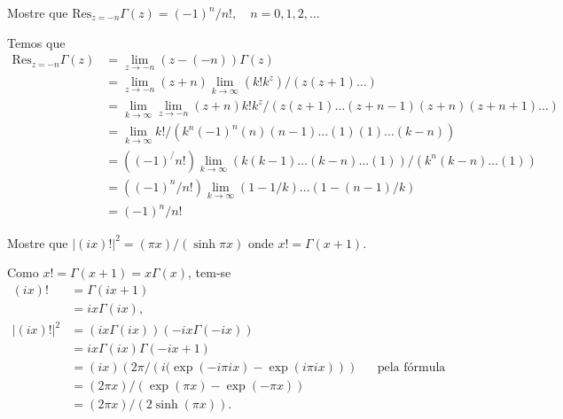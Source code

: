 \documentclass[a4paper,12pt, leqno, answers]{exam}
\begin{document}
\begin{questions}
    \question Mostre que $\mathrm{Res}_{z = -n} \Gamma(z) = \left( -1 \right)^n / n!, \quad n = 0, 1, 2, \ldots$
    \begin{solution}
        Temos que
        \begin{align*}
            \mathrm{Res}_{z = -n} \Gamma(z) &= \lim_{z \to - n} \left( z - (-n) \right) \Gamma(z) \\
            &= \lim_{z \to -n} \left( z + n \right) \lim_{k \to \infty} \left( k! k^z \right) / \left( z (z + 1) \ldots \right) \\
            &= \lim_{k \to \infty} \lim_{z \to -n} (z + n) k! k^z / \left( z (z + 1) \ldots (z + n - 1) (z + n) (z + n + 1) \ldots \right) \\
            &= \lim_{k \to \infty} k! / \left( k^n (-1)^n (n) (n - 1) \ldots (1) (1) \ldots (k - n) \right) \\
            &= \left( (-1)^ / n! \right) \lim_{k \to \infty} \left( k (k - 1) \ldots (k - n) \ldots (1) \right) / \left( k^n (k - n) \ldots (1) \right) \\
            &= \left( (-1)^n / n! \right) \lim_{k \to \infty} \left( 1 - 1 /k \right) \ldots \left( 1 - (n - 1) / k \right) \\
            &= (-1)^n / n!
        \end{align*}
    \end{solution}

    \question Mostre que $| \left( i x \right)! |^2 = \left( \pi x \right) / \left( \sinh \pi x \right)$ onde $x! = \Gamma(x + 1)$.
    \begin{solution}
        Como $x! = \Gamma(x + 1) = x \Gamma(x)$, tem-se
        \begin{align*}
            (i x)! &= \Gamma(ix + 1) \\
            &= ix \Gamma(i x), \\
            | (i x)! |^2 &= \left( i x \Gamma(i x) \right) \left( -i x \Gamma(-i x) \right) \\
            &= i x \Gamma(i x) \Gamma(-i x + 1) \\
            &= (i x) \left( 2 \pi / \left( i ( \exp(-i \pi i x) - \exp(i \pi i x) \right) \right) && \text{pela f\'{o}rmula de reflex\~{a}o} \\
            &=\left( 2 \pi x \right) / \left( \exp(\pi x) - \exp(-\pi x) \right) \\
            &= \left( 2 \pi x \right) / \left( 2 \sinh(\pi x) \right).
        \end{align*}


\end{solution}
\end{questions}
\end{document}
